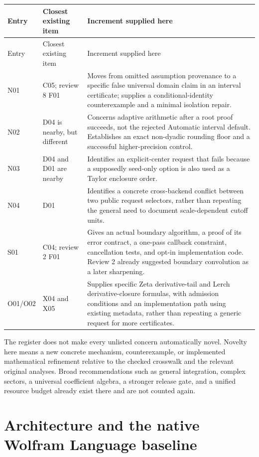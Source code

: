 \documentclass[11pt,a4paper]{article}
\begin{document}
\begingroup\small
\begin{longtable}{@{}p{}p{}p{}@{}}
\toprule Entry & Closest existing item & Increment supplied here\\\midrule\endfirsthead
\toprule Entry & Closest existing item & Increment supplied here\\\midrule\endhead
N01 & C05; review 8 F01 & Moves from omitted assumption provenance to a specific false universal domain claim in an interval certificate; supplies a conditional-identity counterexample and a minimal isolation repair.\\
N02 & D04 is nearby, but different & Concerns adaptive arithmetic after a root proof succeeds, not the rejected Automatic interval default. Establishes an exact non-dyadic rounding floor and a successful higher-precision control.\\
N03 & D04 and D01 are nearby & Identifies an explicit-center request that fails because a supposedly seed-only option is also used as a Taylor enclosure order.\\
N04 & D01 & Identifies a concrete cross-backend conflict between two public request selectors, rather than repeating the general need to document scale-dependent cutoff units.\\
S01 & C04; review 2 F01 & Gives an actual boundary algorithm, a proof of its error contract, a one-pass callback constraint, cancellation tests, and opt-in implementation code. Review 2 already suggested boundary convolution as a later sharpening.\\
O01/O02 & X04 and X05 & Supplies specific Zeta derivative-tail and Lerch derivative-closure formulas, with admission conditions and an implementation path using existing metadata, rather than repeating a generic request for more certificates.\\
\bottomrule
\end{longtable}
\endgroup

The register does not make every unlisted concern automatically novel. Novelty here means a new concrete mechanism, counterexample, or implemented mathematical refinement relative to the checked crosswalk and the relevant original analyses. Broad recommendations such as general integration, complex sectors, a universal coefficient algebra, a stronger release gate, and a unified resource budget already exist there and are not counted again.

\section{Architecture and the native Wolfram Language baseline}
\end{document}
